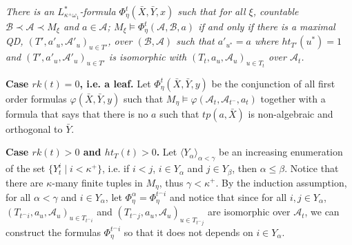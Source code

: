 \documentclass[12pt,a4paper]{amsart}
\theoremstyle{definition}
\theoremstyle{remark}
\renewcommand{\mid}{\mathrel{|}\allowbreak}
\begin{document}
\textit{There is an $L^*_{\kappa^+\omega_1}$-formula $\Phi^t_\eta(\bar{X},\bar{Y},x)$ such that for all $\xi$, countable $\mathcal{B}\prec \mathcal{A}\prec M_\xi$ and $a\in\mathcal{A}$; $M_\xi\models \Phi^t_\eta(\mathcal{A},\mathcal{B},a)$ if and only if there is a maximal QD, $(T',a'_u,\mathcal{A}'_u)_{u\in T'}$, over $(\mathcal{B},\mathcal{A})$ such that $a'_{u^*}=a$ where $ht_{T'}(u^*)=1$ and $(T',a'_u,\mathcal{A}'_u)_{u\in T'}$ is isomorphic with $(T_t,a_u,\mathcal{A}_u)_{u\in T_t}$ over $\mathcal{A}_t$.}


{\bf Case $rk(t)=0$, i.e. a leaf.} Let $\Phi_\eta^t(\bar{X},\bar{Y}, y)$ be the conjunction of all first order formulas $\varphi(\bar{X},\bar{Y}, y)$ such that $M_\eta\models \varphi(\mathcal{A}_t,\mathcal{A}_{t^-},a_t)$ together with a formula that says that there is no $a$ such that $tp(a,\bar{X})$ is non-algebraic and orthogonal to $\bar{Y}$.


{\bf Case $rk(t)>0$ and $ht_T(t)>0$.} Let $\langle Y_\alpha\rangle_{\alpha<\gamma}$ be an increasing enumeration of the set $\{Y^i_t\mid i<\kappa^+\}$, i.e. if $i<j$, $i\in Y_\alpha$ and $j\in Y_\beta$, then $\alpha\leq \beta$. Notice that there are $\kappa$-many finite tuples in $M_\eta$, thus $\gamma<\kappa^+$.
By the induction assumption, for all $\alpha<\gamma$ and $i\in Y_\alpha$, let $\Phi_\eta^\alpha=\Phi_\eta^{t^\frown i}$ and notice that since for all $i,j\in Y_\alpha$, $(T_{t^\frown i}, a_u, \mathcal{A}_u)_{u\in T_{t^\frown i}}$ and $(T_{t^\frown j}, a_u, \mathcal{A}_u)_{u\in T_{t^\frown j}}$ are isomorphic over $\mathcal{A}_t$, we can construct the formulas $\Phi_\eta^{t^\frown i}$ so that it does not depends on $i\in Y_\alpha$.
\end{document}
